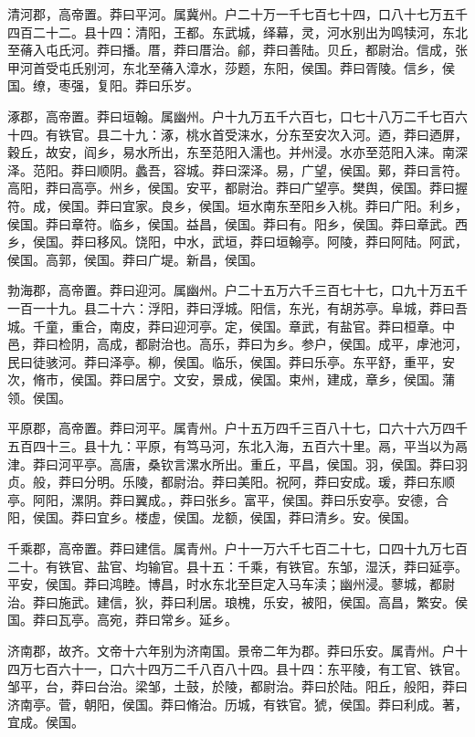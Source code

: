 \documentclass[12pt,UTF8]{ctexbook}
\begin{document}
清河郡，高帝置。莽曰平河。属冀州。户二十万一千七百七十四，口八十七万五千四百二十二。县十四：清阳，王都。东武城，绎幕，灵，河水别出为鸣犊河，东北至蓨入屯氏河。莽曰播。厝，莽曰厝治。鄃，莽曰善陆。贝丘，都尉治。信成，张甲河首受屯氏别河，东北至蓨入漳水，莎题，东阳，侯国。莽曰胥陵。信乡，侯国。缭，枣强，复阳。莽曰乐岁。



涿郡，高帝置。莽曰垣翰。属幽州。户十九万五千六百七，口七十八万二千七百六十四。有铁官。县二十九：涿，桃水首受涞水，分东至安次入河。迺，莽曰迺屏，穀丘，故安，阎乡，易水所出，东至范阳入濡也。并州浸。水亦至范阳入涞。南深泽。范阳。莽曰顺阴。蠡吾，容城。莽曰深泽。易，广望，侯国。鄚，莽曰言符。高阳，莽曰高亭。州乡，侯国。安平，都尉治。莽曰广望亭。樊舆，侯国。莽曰握符。成，侯国。莽曰宜家。良乡，侯国。垣水南东至阳乡入桃。莽曰广阳。利乡，侯国。莽曰章符。临乡，侯国。益昌，侯国。莽曰有。阳乡，侯国。莽曰章武。西乡，侯国。莽曰移风。饶阳，中水，武垣，莽曰垣翰亭。阿陵，莽曰阿陆。阿武，侯国。高郭，侯国。莽曰广堤。新昌，侯国。



勃海郡，高帝置。莽曰迎河。属幽州。户二十五万六千三百七十七，口九十万五千一百一十九。县二十六：浮阳，莽曰浮城。阳信，东光，有胡苏亭。阜城，莽曰吾城。千童，重合，南皮，莽曰迎河亭。定，侯国。章武，有盐官。莽曰桓章。中邑，莽曰检阴，高成，都尉治也。高乐，莽曰为乡。参户，侯国。成平，虖池河，民曰徒骇河。莽曰泽亭。柳，侯国。临乐，侯国。莽曰乐亭。东平舒，重平，安次，脩市，侯国。莽曰居宁。文安，景成，侯国。束州，建成，章乡，侯国。蒲领。侯国。



平原郡，高帝置。莽曰河平。属青州。户十五万四千三百八十七，口六十六万四千五百四十三。县十九：平原，有笃马河，东北入海，五百六十里。鬲，平当以为鬲津。莽曰河平亭。高唐，桑钦言漯水所出。重丘，平昌，侯国。羽，侯国。莽曰羽贞。般，莽曰分明。乐陵，都尉治。莽曰美阳。祝阿，莽曰安成。瑗，莽曰东顺亭。阿阳，漯阴。莽曰翼成。，莽曰张乡。富平，侯国。莽曰乐安亭。安德，合阳，侯国。莽曰宜乡。楼虚，侯国。龙额，侯国，莽曰清乡。安。侯国。



千乘郡，高帝置。莽曰建信。属青州。户十一万六千七百二十七，口四十九万七百二十。有铁官、盐官、均输官。县十五：千乘，有铁官。东邹，湿沃，莽曰延亭。平安，侯国。莽曰鸿睦。博昌，时水东北至巨定入马车渎；幽州浸。蓼城，都尉治。莽曰施武。建信，狄，莽曰利居。琅槐，乐安，被阳，侯国。高昌，繁安。侯国。莽曰瓦亭。高宛，莽曰常乡。延乡。



济南郡，故齐。文帝十六年别为济南国。景帝二年为郡。莽曰乐安。属青州。户十四万七百六十一，口六十四万二千八百八十四。县十四：东平陵，有工官、铁官。邹平，台，莽曰台治。梁邹，土鼓，於陵，都尉治。莽曰於陆。阳丘，般阳，莽曰济南亭。菅，朝阳，侯国。莽曰脩治。历城，有铁官。猇，侯国。莽曰利成。著，宜成。侯国。
\end{document}
